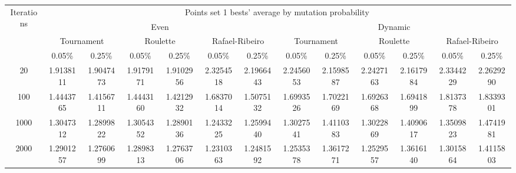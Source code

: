 \begin{center}
	\begin{tabular}{|c|c|c|c|c|c|c|c|c|c|c|c|c|}
		\hline
		\multirow{4}{*}{Iterations}	&	\multicolumn{12}{c|}{Points set 1 bests' average by mutation probability}	\\
										\cline{2-13}
									&	\multicolumn{6}{c|}{Even}																																												&	\multicolumn{6}{c|}{Dynamic} \\
									\cline{2-13}

									&	\multicolumn{2}{c|}{Tournament}							&	\multicolumn{2}{c|}{Roulette}							&	\multicolumn{2}{c|}{Rafael-Ribeiro}												&	\multicolumn{2}{c|}{Tournament}												&	\multicolumn{2}{c|}{Roulette}													&	\multicolumn{2}{c|}{Rafael-Ribeiro}												\\
									\cline{2-13}
									&	0.05\%			&	0.25\%								&	0.05\%			&	0.25\%								&	0.05\%									&	0.25\%								&	0.05\%								&	0.25\%								&	0.05\%									&	0.25\%								&	0.05\%								&	0.25\%									\\
		\noalign{\hrule height 1.5pt}
		20							&	1.9138111		& 	1.9047473 \cellcolor[gray]{0.9}		&	1.9179171		&	1.9102956 \cellcolor[gray]{0.9}		&	2.3254518								&	2.1966443 \cellcolor[gray]{0.9}		&	2.2456053							& 	2.1598587 \cellcolor[gray]{0.9}		&	2.2427163								&	2.1617984 \cellcolor[gray]{0.9}		&	2.3344229							&	2.2629290 \cellcolor[gray]{0.9}			\\
		\hline
		100							&	1.4443765		&	1.4156711 \cellcolor[gray]{0.9}		&	1.4443160		&	1.4212932 \cellcolor[gray]{0.9} 	&	1.6837014								&	1.5075132 \cellcolor[gray]{0.9}		&	1.6993526 \cellcolor[gray]{0.9}		& 	1.7022169							&	1.6926368 \cellcolor[gray]{0.9}			&	1.6941899							&	1.8137378 \cellcolor[gray]{0.9}		&	1.8339301								\\
		\hline
		1000						&	1.3047312		&	1.2899822 \cellcolor[gray]{0.9}		&	1.3054352		&	1.2890136 \cellcolor[gray]{0.9}		&	1.2433225 \cellcolor[gray]{0.9}			&	1.2599440							&	1.3027541 \cellcolor[gray]{0.9}		& 	1.4110383							&	1.3022869 \cellcolor[gray]{0.9}			&	1.4090617							&	1.3509823 \cellcolor[gray]{0.9}		&	1.4741981								\\
		\hline
		2000						&	1.2901257		&	1.2760699 \cellcolor[gray]{0.9}		&	1.2898313		&	1.2763706 \cellcolor[gray]{0.9}		&	1.2310363 \cellcolor[gray]{0.9}			&	1.2481592							&	1.2535378 \cellcolor[gray]{0.9}		& 	1.3617271							&	1.2529557 \cellcolor[gray]{0.9}			&	1.3616140							&	1.3015864 \cellcolor[gray]{0.9}		&	1.4115803								\\
		\hline
	\end{tabular}
	\label{tab:selection_type_1_best}
\end{center}
